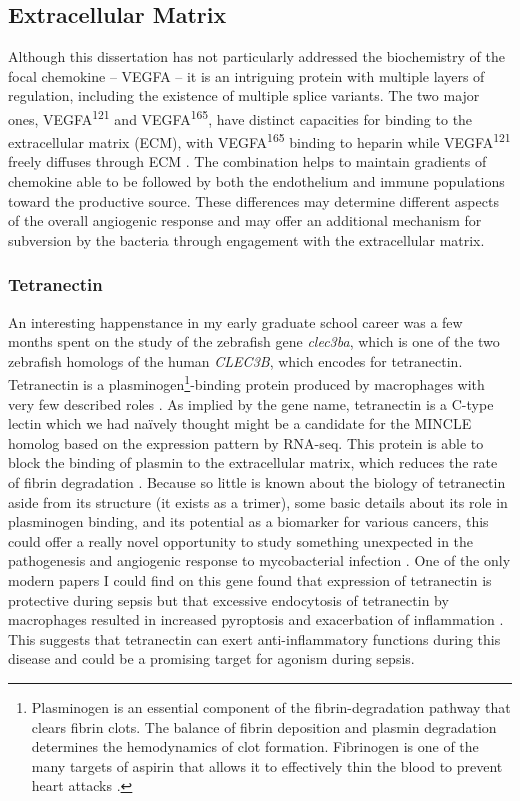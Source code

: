 \subsection{Extracellular Matrix}\label{ecm}

Although this dissertation has not particularly addressed the biochemistry of the focal chemokine -- VEGFA -- it is an intriguing protein with multiple layers of regulation, including the existence of multiple splice variants. The two major ones, VEGFA\textsuperscript{121} and VEGFA\textsuperscript{165}, have distinct capacities for binding to the extracellular matrix (ECM), with VEGFA\textsuperscript{165} binding to heparin while VEGFA\textsuperscript{121} freely diffuses through ECM \citep{Fearnley2016, Shibuya2011}. The combination helps to maintain gradients of chemokine able to be followed by both the endothelium and immune populations toward the productive source. These differences may determine different aspects of the overall angiogenic response and may offer an additional mechanism for subversion by the bacteria through engagement with the extracellular matrix. 

\subsubsection{Tetranectin}\label{clec3ba}

An interesting happenstance in my early graduate school career was a few months spent on the study of the zebrafish gene \textit{clec3ba}, which is one of the two zebrafish homologs of the human \textit{CLEC3B}, which encodes for tetranectin. Tetranectin is a plasminogen\footnote{Plasminogen is an essential component of the fibrin\hyp{}degradation pathway that clears fibrin clots. The balance of fibrin deposition and plasmin degradation determines the hemodynamics of clot formation. Fibrinogen is one of the many targets of aspirin that allows it to effectively thin the blood to prevent heart attacks \citep{Bjornsson1989, Keragala2021}.}\hyp{}binding protein produced by macrophages with very few described roles \citep{Nielsen1993}. As implied by the gene name, tetranectin is a C\hyp{}type lectin which we had na\"{i}vely thought might be a candidate for the MINCLE homolog based on the expression pattern by RNA\hyp{}seq. This protein is able to block the binding of plasmin to the extracellular matrix, which reduces the rate of fibrin degradation \citep{Mogues2004}. Because so little is known about the biology of tetranectin aside from its structure (it exists as a trimer), some basic details about its role in plasminogen binding, and its potential as a biomarker for various cancers, this could offer a really novel opportunity to study something unexpected in the pathogenesis and angiogenic response to mycobacterial infection \citep{Holtet1997, Nielsen1997, Graversen1998}. One of the only modern papers I could find on this gene found that expression of tetranectin is protective during sepsis but that excessive endocytosis of tetranectin by macrophages resulted in increased pyroptosis and exacerbation of inflammation \citep{Chen2020}. This suggests that tetranectin can exert anti\hyp{}inflammatory functions during this disease and could be a promising target for agonism during sepsis.

